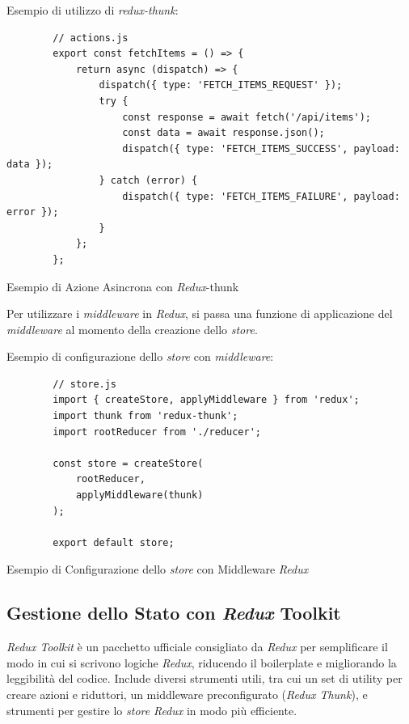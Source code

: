 Esempio di utilizzo di \textit{redux-thunk}:
\begin{listing}[H]
    \begin{verbatim}
        // actions.js
        export const fetchItems = () => {
            return async (dispatch) => {
                dispatch({ type: 'FETCH_ITEMS_REQUEST' });
                try {
                    const response = await fetch('/api/items');
                    const data = await response.json();
                    dispatch({ type: 'FETCH_ITEMS_SUCCESS', payload: data });
                } catch (error) {
                    dispatch({ type: 'FETCH_ITEMS_FAILURE', payload: error });
                }
            };
        };
    \end{verbatim}
    \caption{Esempio di Azione Asincrona con \textit{Redux}-thunk}
    \label{listing:azione_thunk}
\end{listing}

Per utilizzare i \textit{middleware} in \textit{Redux}, si passa una funzione di applicazione del \textit{middleware} al momento della creazione dello \textit{store}.

Esempio di configurazione dello \textit{store} con \textit{middleware}:
\begin{listing}[H]
    \begin{verbatim}
        // store.js
        import { createStore, applyMiddleware } from 'redux';
        import thunk from 'redux-thunk';
        import rootReducer from './reducer';

        const store = createStore(
            rootReducer,
            applyMiddleware(thunk)
        );

        export default store;
    \end{verbatim}
    \caption{Esempio di Configurazione dello \textit{store} con Middleware \textit{Redux}}
    \label{listing:store}
\end{listing}

\subsection{Gestione dello Stato con \textit{Redux} Toolkit}
\label{subsec:redux_toolkit}

\textit{Redux Toolkit} è un pacchetto ufficiale consigliato da \textit{Redux} per semplificare il modo in cui si scrivono logiche \textit{Redux}, riducendo il boilerplate e migliorando la leggibilità del codice.
Include diversi strumenti utili, tra cui un set di utility per creare azioni e riduttori, un middleware preconfigurato (\textit{Redux Thunk}), e strumenti per gestire lo \textit{store} \textit{Redux} in modo più efficiente.

